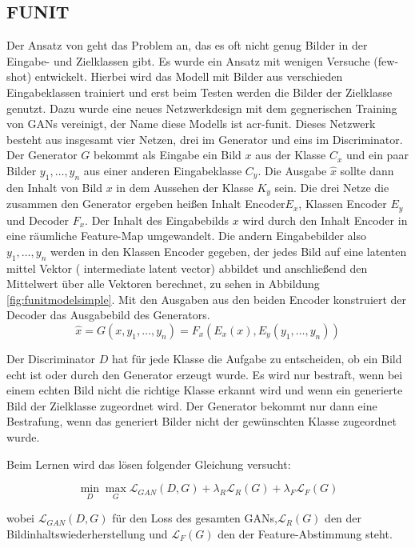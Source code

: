  \subsection{FUNIT}%
 \label{sub:funit}
 Der Ansatz von \citeauthor{liu_few-shot_2019} \cite{liu_few-shot_2019}  geht das Problem an, das es oft nicht genug Bilder in der Eingabe- und Zielklassen gibt. Es wurde ein Ansatz mit wenigen Versuche (few-shot) entwickelt. Hierbei wird das Modell mit Bilder aus verschieden Eingabeklassen trainiert und erst beim Testen werden die Bilder der Zielklasse genutzt.
 Dazu wurde eine neues Netzwerkdesign mit dem gegnerischen Training von GANs vereinigt, der Name diese Modells ist  \acrfull{acr-funit}. Dieses Netzwerk besteht aus insgesamt vier Netzen, drei im Generator und eins im Discriminator. Der Generator $G$ bekommt als Eingabe ein Bild $x$ aus der Klasse $C_x$ und ein paar Bilder $y_1,\dots,y_n$ aus einer anderen Eingabeklasse $C_y$. Die Ausgabe $\hat{x}$ sollte dann den Inhalt von Bild $x$ in dem Aussehen der Klasse $K_y$ sein. 
 Die drei Netze die zusammen den Generator ergeben heißen Inhalt Encoder$E_x$, Klassen Encoder $E_y$ und Decoder $F_x$.
 Der Inhalt des Eingabebilds $x$ wird durch den Inhalt Encoder in eine räumliche Feature-Map umgewandelt. Die andern Eingabebilder also  $y_1,\dots,y_n$ werden in den Klassen Encoder gegeben, der  jedes Bild auf eine latenten mittel Vektor ( intermediate latent vector) abbildet und anschließend den Mittelwert über alle Vektoren berechnet, zu sehen in Abbildung \ref{fig:funitmodelsimple}. 
 Mit den Ausgaben aus den beiden Encoder konstruiert der Decoder das Ausgabebild des Generators. 
 \[\hat{x} = G(x, y_1,\dots,y_n)= F_x(E_x(x), E_y(y_1,\dots,y_n))\]
 
 Der Discriminator $D$ hat für jede Klasse die Aufgabe zu entscheiden, ob ein Bild echt ist oder durch den Generator erzeugt wurde. Es wird nur bestraft, wenn bei einem echten Bild nicht die richtige Klasse erkannt wird und wenn ein generierte Bild der Zielklasse zugeordnet wird. Der Generator bekommt nur dann eine Bestrafung, wenn das generiert Bilder nicht der gewünschten Klasse zugeordnet wurde.
 
 Beim Lernen wird das lösen folgender Gleichung versucht:
 
 \[\min_{D} \max_{G} \mathcal{L}_{GAN}(D,G) + \lambda_R \mathcal{L}_R(G) + \lambda_F \mathcal{L}_{F}(G) \]
 
 wobei $ \mathcal{L}_{GAN}(D,G)$ für den Loss des gesamten GANs,$ \mathcal{L}_R(G)$ den der Bildinhaltswiederherstellung und $\mathcal{L}_{F}(G) $ den der Feature-Abstimmung  steht. 
 
